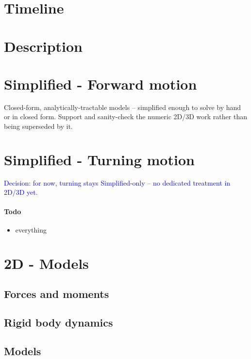 \documentclass[10pt]{extarticle}
\numberwithin{equation}{subsection}
\newcommand{\ai}[1]{\textcolor{blue}{#1}}
\newenvironment{aiblock}{\color{blue}}{}
\newcommand{\subsubsubsection}[1]{\paragraph{#1}}
\begin{document}
\tableofcontents
\newpage

\section{Timeline}


\section{Description}


\newpage
\section{Simplified - Forward motion}
\label{sec:simplified}
\begin{aiblock}
Closed-form, analytically-tractable models -- simplified enough to solve by hand or in closed form. Support and sanity-check the numeric 2D/3D work rather than being superseded by it.
\end{aiblock}


\newpage
\section{Simplified - Turning motion}
\ai{Decision: for now, turning stays Simplified-only -- no dedicated treatment in 2D/3D yet.}
\subsubsubsection{Todo}
\begin{itemize}
    \item everything
\end{itemize}

\newpage
\section{2D - Models}
\label{sec:2dmodels}
\subsection{Forces and moments}
\label{sec:2dmodels-forces}


\subsection{Rigid body dynamics}


\subsection{Models}
\label{sec:2dmodels-models}

\end{document}
